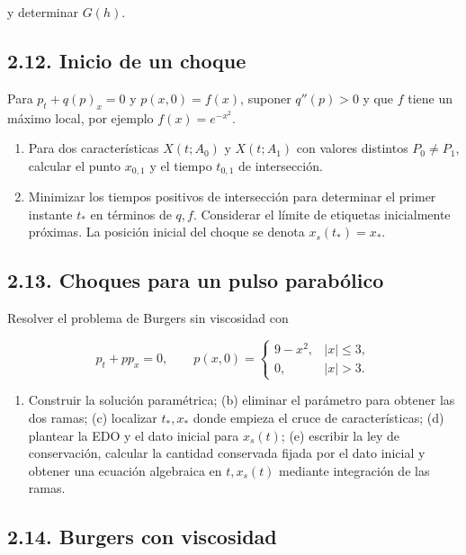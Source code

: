 \documentclass[11pt,a4paper]{article}
\providecommand{\tightlist}{\setlength{\itemsep}{0pt}\setlength{\parskip}{0pt}}
\begin{document}
y determinar \(G(h)\).

\hypertarget{inicio-de-un-choque}{%
\subsection{2.12. Inicio de un choque}\label{inicio-de-un-choque}}

Para \(p_t+q(p)_x=0\) y \(p(x,0)=f(x)\), suponer \(q''(p)>0\) y que
\(f\) tiene un máximo local, por ejemplo \(f(x)=e^{-x^2}\).

\begin{enumerate}
\def\labelenumi{(\alph{enumi})}
\item
  Para dos características \(X(t;A_0)\) y \(X(t;A_1)\) con valores
  distintos \(P_0\ne P_1\), calcular el punto \(x_{0,1}\) y el tiempo
  \(t_{0,1}\) de intersección.
\item
  Minimizar los tiempos positivos de intersección para determinar el
  primer instante \(t_*\) en términos de \(q,f\). Considerar el límite
  de etiquetas inicialmente próximas. La posición inicial del choque se
  denota \(x_s(t_*)=x_*\).
\end{enumerate}

\hypertarget{choques-para-un-pulso-parabuxf3lico}{%
\subsection{2.13. Choques para un pulso
parabólico}\label{choques-para-un-pulso-parabuxf3lico}}

Resolver el problema de Burgers sin viscosidad con

\[p_t+pp_x=0,\qquad p(x,0)=\begin{cases}9-x^2,&|x|\le3,\\0,&|x|>3.\end{cases}\]

\begin{enumerate}
\def\labelenumi{(\alph{enumi})}
\tightlist
\item
  Construir la solución paramétrica; (b) eliminar el parámetro para
  obtener las dos ramas; (c) localizar \(t_*,x_*\) donde empieza el
  cruce de características; (d) plantear la EDO y el dato inicial para
  \(x_s(t)\); (e) escribir la ley de conservación, calcular la cantidad
  conservada fijada por el dato inicial y obtener una ecuación
  algebraica en \(t,x_s(t)\) mediante integración de las ramas.
\end{enumerate}

\hypertarget{burgers-con-viscosidad}{%
\subsection{2.14. Burgers con viscosidad}\label{burgers-con-viscosidad}}
\end{document}

